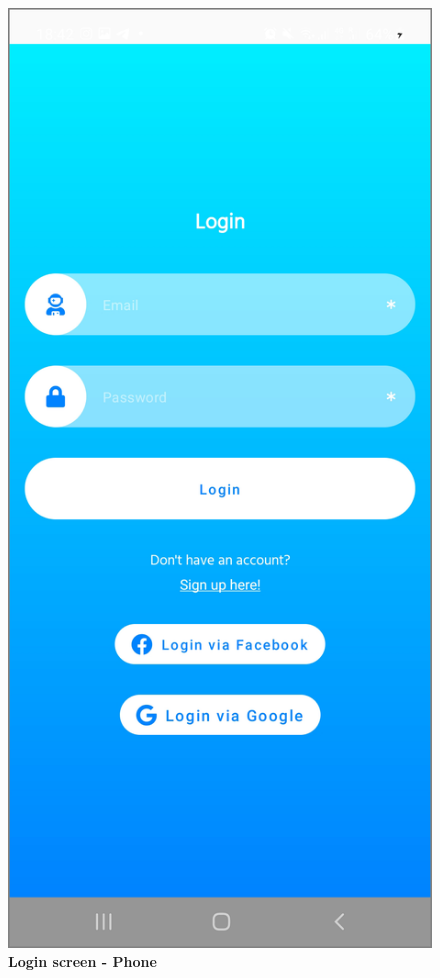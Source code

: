 \begin{figure}[!htb]
\begin{minipage}{.45\textwidth}
\includegraphics[width=.8\textwidth]{../Images/UI/Login.jpg}
\caption{\label{fig:dbapiuser}\textbf{Login screen - Phone}}
\end{minipage}
\end{figure}
 
